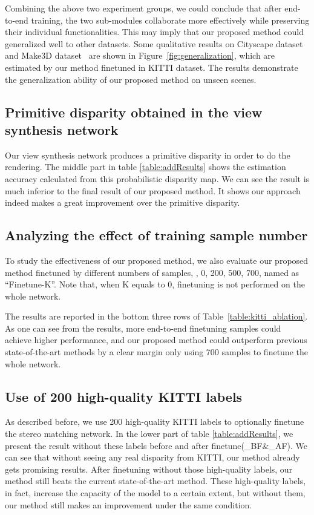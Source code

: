 \documentclass[10pt,twocolumn,letterpaper]{article}
\begin{document}
Combining the above two experiment groups, we could conclude that after end-to-end training, the two sub-modules collaborate more effectively while preserving their individual functionalities. This may imply that our proposed method could generalized well to other datasets. Some qualitative results on Cityscape dataset~\cite{Cordts2016Cityscapes} and Make3D dataset~\cite{Saxena09make3D} are shown in Figure~\ref{fig:generalization}, which are estimated by our method finetuned in KITTI dataset. The results demonstrate the generalization ability of our proposed method on unseen scenes.


\subsection{Primitive disparity obtained in the view synthesis network} 
Our view synthesis network produces a primitive disparity in order to do the rendering. The middle part in table \ref{table:addResults} shows the estimation accuracy calculated from this probabilistic disparity map. We can see the result is much inferior to the final result of our proposed method. It shows our approach indeed makes a great improvement over the primitive disparity.


\subsection{Analyzing the effect of training sample number} 
To study the effectiveness of our proposed method, we also evaluate our proposed method finetuned by different numbers of samples, \ie, 0, 200, 500, 700, named as ``Finetune-K''. Note that, when K equals to 0, finetuning is not performed on the whole network. 

The results are reported in the bottom three rows of Table~\ref{table:kitti_ablation}. As one can see from the results, more end-to-end finetuning samples could achieve higher performance, and our proposed method could outperform previous state-of-the-art methods by a clear margin only using 700 samples to finetune the whole network. 

\subsection{Use of 200 high-quality KITTI labels} 
As described before, we use 200 high-quality KITTI labels to optionally finetune the stereo matching network. In the lower part of table \ref{table:addResults}, we present the result without these labels before and after finetune(\_BF\&\_AF). We can see that without seeing any real disparity from KITTI, our method already gets promising results. After finetuning without those high-quality labels, our method still beats the current state-of-the-art method. These high-quality labels, in fact, increase the capacity of the model to a certain extent, but without them, our method still makes an improvement under the same condition.
\end{document}

